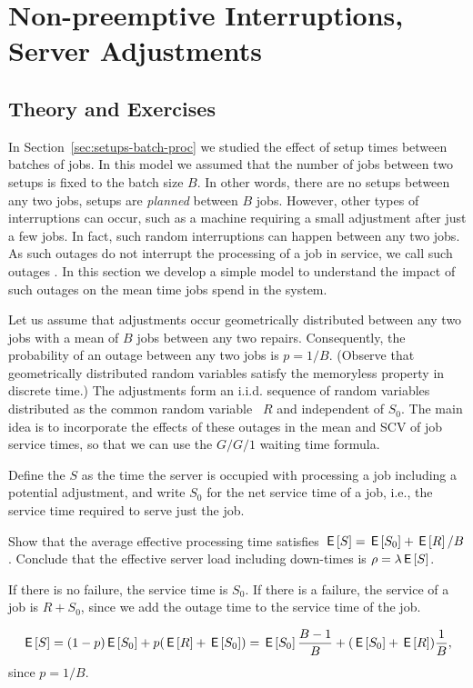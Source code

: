 \section{Non-preemptive Interruptions, Server Adjustments}
\label{sec:non-preempt-interr}

\subsection*{Theory and Exercises}




In Section~\ref{sec:setups-batch-proc} we studied the effect of setup times between batches of jobs.
In this model we assumed that the number of jobs between two setups is fixed to the batch size $B$.
In other words, there are no setups between any two jobs, setups are \emph{planned} between $B$ jobs.
However, other types of interruptions can occur, such as a machine requiring a small adjustment after just a few jobs.
In fact, such random interruptions can happen between any two jobs.
As such outages do not interrupt the processing of a job in service, we call such outages .
In this section we develop a simple model to understand the impact of such outages on the mean time jobs spend in the system.

Let us assume that adjustments occur geometrically distributed between any two jobs with a mean of $B$ jobs between any two repairs.
Consequently, the probability of an outage between any two jobs is $p=1/B$.
(Observe that geometrically distributed random variables satisfy the memoryless property in discrete time.)
The adjustments form an i.i.d.
sequence of random variables distributed as the common random variable ~$R$ and independent of $S_0$.
The main idea is to incorporate the effects of these outages in the mean and SCV of job service times, so that we can use the $G/G/1$ waiting time formula.

Define the  $S$ as the time the server is occupied with processing a job including a potential adjustment, and write $S_0$ for the net service time of a job, i.e., the service time required to serve just the job.

\begin{exercise}[\faCalculator]
  Show that the average effective processing time satisfies $ \,\mathsf{E}\left[S\right] = \,\mathsf{E}\left[S_0\right] + \,\mathsf{E}\left[R\right]/B$. Conclude that the effective server load including down-times is $\rho = \lambda \,\mathsf{E}\left[S\right]$. 
\begin{hint}
If there is no failure, the service time is $S_0$. If there is a failure, the service of a job is $R + S_0$, since we add the outage time to the service time of the job. 
\end{hint}
  \begin{solution}
    \begin{equation*}
      \,\mathsf{E}\left[S\right] = (1-p)\,\mathsf{E}\left[S_0\right] + p (\,\mathsf{E}\left[R\right] + \,\mathsf{E}\left[S_0\right]) = \,\mathsf{E}\left[S_0\right] \frac{B-1}B + (\,\mathsf{E}\left[S_0\right] + \,\mathsf{E}\left[R\right]) \frac 1B,
    \end{equation*}
since $p=1/B$. 
  \end{solution}
\end{exercise}

